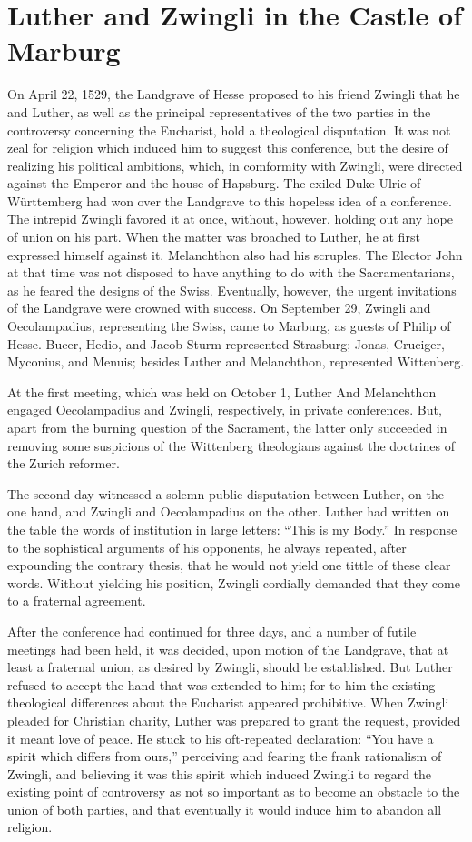\section{Luther and Zwingli in the Castle of Marburg}

On April 22, 1529, the Landgrave of Hesse proposed to his friend
Zwingli that he and Luther, as well as the principal representatives
of the two parties in the controversy concerning the Eucharist, hold
a theological disputation. It was not zeal for religion which induced
him to suggest this conference, but the desire of realizing his political
ambitions, which, in comformity with Zwingli, were directed against
the Emperor and the house of Hapsburg. The exiled Duke Ulric of
Württemberg had won over the Landgrave to this hopeless idea of a
conference. The intrepid Zwingli favored it at once, without, however,
holding out any hope of union on his part. When the matter
was broached to Luther, he at first expressed himself against it.
Melanchthon also had his scruples. The Elector John at that time
was not disposed to have anything to do with the Sacramentarians, as
he feared the designs of the Swiss. Eventually, however, the urgent
invitations of the Landgrave were crowned with success. On September 29,
Zwingli and Oecolampadius, representing the Swiss, came to
Marburg, as guests of Philip of Hesse. Bucer, Hedio, and Jacob Sturm
represented Strasburg; Jonas, Cruciger, Myconius, and Menuis; besides
Luther and Melanchthon, represented Wittenberg.

At the first meeting, which was held on October 1, Luther And
Melanchthon engaged Oecolampadius and Zwingli, respectively, in
private conferences. But, apart from the burning question of the
Sacrament, the latter only succeeded in removing some suspicions of
the Wittenberg theologians against the doctrines of the Zurich reformer.

The second day witnessed a solemn public disputation between
Luther, on the one hand, and Zwingli and Oecolampadius on the
other. Luther had written on the table the words of institution in
large letters: “This is my Body.” In response to the sophistical arguments
of his opponents, he always repeated, after expounding the contrary thesis,
that he would not yield one tittle of these clear words.
Without yielding his position, Zwingli cordially demanded that they
come to a fraternal agreement.

After the conference had continued for three days, and a number
of futile meetings had been held, it was decided, upon motion of the
Landgrave, that at least a fraternal union, as desired by Zwingli,
should be established. But Luther refused to accept the hand that
was extended to him; for
to him the existing theological differences
about the Eucharist appeared prohibitive. When Zwingli pleaded
for Christian charity, Luther was prepared to grant the request,
provided it meant love of peace. He stuck to his oft-repeated declaration:
“You have a spirit which differs from ours,” perceiving and
fearing the frank rationalism of Zwingli, and believing it was this
spirit which induced Zwingli to regard the existing point of controversy
as not so important as to become an obstacle to the union
of both parties, and that eventually it would induce him to abandon
all religion.

